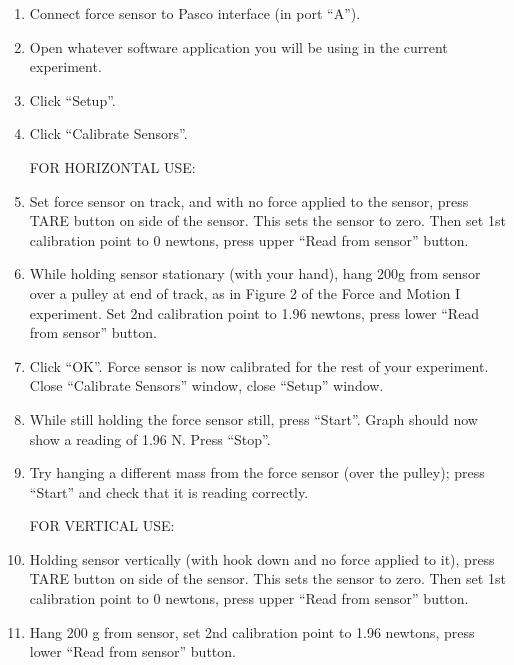 \begin{enumerate}
\item Connect force sensor to Pasco interface (in port ``A'').

\item Open whatever software application you will be using in the current experiment.

\item Click ``Setup''.

\item Click ``Calibrate Sensors''.

\vspace{0.1in}
\hspace{-0.2in}FOR HORIZONTAL USE:

\item Set force sensor on track, and with no force applied to the sensor, press TARE button on side of the sensor. This sets the sensor to zero. Then set 1st calibration point to 0 newtons, press upper ``Read from sensor'' button.

\item While holding sensor stationary (with your hand), hang 200g from sensor over a pulley at end of track, as in Figure 2 of the Force and Motion I experiment. Set 2nd calibration point to 1.96 newtons, press lower ``Read from sensor'' button.

\item Click ``OK''. Force sensor is now calibrated for the rest of your experiment. Close ``Calibrate Sensors'' window, close ``Setup'' window.

\item While still holding the force sensor still, press ``Start''. Graph should now show a reading of 1.96 N. Press ``Stop''.

\item Try hanging a different mass from the force sensor (over the pulley); press ``Start'' and check that it is reading correctly.

\vspace{0.1in}
\hspace{-0.2in}FOR VERTICAL USE:

\setcounter{enumi}{4}

\item Holding sensor vertically (with hook down and no force applied to it), press TARE button on side of the sensor. This sets the sensor to zero. Then set 1st calibration point to 0 newtons, press upper ``Read from sensor'' button.

\item Hang 200 g from sensor, set 2nd calibration point to 1.96 newtons, press lower ``Read from sensor'' button.


\end{enumerate}
